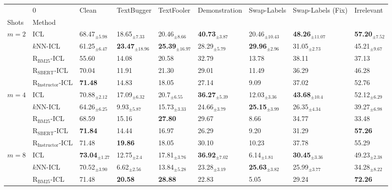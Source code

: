 \begin{tabular}{lllllllll}
\toprule
 & 0 & Clean & TextBugger & TextFooler & Demonstration & Swap-Labels & Swap-Labels (Fix) & Irrelevant  \\
Shots & Method &  &  &  &  &  &  &  \\
\midrule
\multirow[t]{5}{*}{$m=2$} & ICL & 68.47$_{\pm5.98}$ & 18.65$_{\pm7.33}$ & 20.46$_{\pm8.66}$ & \textbf{40.73$_{\pm3.87}$} & 20.46$_{\pm10.43}$ & \textbf{48.26$_{\pm11.07}$} & \textbf{57.20$_{\pm7.52}$} \\
 & $k$NN-ICL & 61.25$_{\pm6.47}$ & \textbf{23.47$_{\pm18.96}$} & \textbf{25.39$_{\pm16.97}$} & 28.29$_{\pm5.79}$ & \textbf{29.96$_{\pm2.96}$} & 31.05$_{\pm2.73}$ & 45.21$_{\pm9.67}$ \\
 & $\text{R}_{\text{BM25}}$-ICL & 55.60 & 14.08 & 20.58 & 32.79 & 13.78 & 38.11 & 37.13 \\
 & $\text{R}_{\text{SBERT}}$-ICL & 70.04 & 11.91 & 21.30 & 29.01 & 11.49 & 36.29 & 46.28 \\
 & $\text{R}_{\text{Instructor}}$-ICL & \textbf{71.48} & 14.83 & 18.05 & 27.14 & 9.09 & 37.02 & 52.76 \\
\cline{1-9}
\multirow[t]{5}{*}{$m=4$} & ICL & 70.88$_{\pm2.12}$ & 17.09$_{\pm6.32}$ & 20.7$_{\pm6.55}$ & \textbf{36.27$_{\pm5.39}$} & 12.03$_{\pm3.36}$ & \textbf{43.68$_{\pm10.4}$} & 52.12$_{\pm6.29}$ \\
 & $k$NN-ICL & 64.26$_{\pm6.25}$ & 9.93$_{\pm5.87}$ & 15.73$_{\pm3.33}$ & 24.66$_{\pm3.79}$ & \textbf{25.15$_{\pm3.99}$} & 26.35$_{\pm4.34}$ & 39.27$_{\pm6.98}$ \\
 & $\text{R}_{\text{BM25}}$-ICL & 68.59 & 15.16 & \textbf{27.80} & 29.67 & 8.66 & 34.77 & 33.48 \\
 & $\text{R}_{\text{SBERT}}$-ICL & \textbf{71.84} & 14.44 & 16.97 & 26.29 & 9.20 & 31.29 & \textbf{57.26} \\
 & $\text{R}_{\text{Instructor}}$-ICL & 71.48 & \textbf{19.86} & 18.05 & 30.10 & 10.23 & 37.78 & 55.29 \\
\cline{1-9}
\multirow[t]{5}{*}{$m=8$} & ICL & \textbf{73.04$_{\pm1.27}$} & 12.75$_{\pm2.4}$ & 17.81$_{\pm3.76}$ & \textbf{36.92$_{\pm7.02}$} & 6.14$_{\pm1.81}$ & \textbf{30.45$_{\pm3.36}$} & 49.23$_{\pm2.38}$ \\
 & $k$NN-ICL & 70.52$_{\pm3.90}$ & 6.62$_{\pm2.56}$ & 13.84$_{\pm5.28}$ & 23.28$_{\pm3.19}$ & \textbf{25.63$_{\pm3.82}$} & 25.99$_{\pm3.77}$ & 34.28$_{\pm8.22}$ \\
 & $\text{R}_{\text{BM25}}$-ICL & 71.48 & \textbf{20.58} & \textbf{28.88} & 22.83 & 5.05 & 29.24 & \textbf{72.26} \\

\end{tabular}

